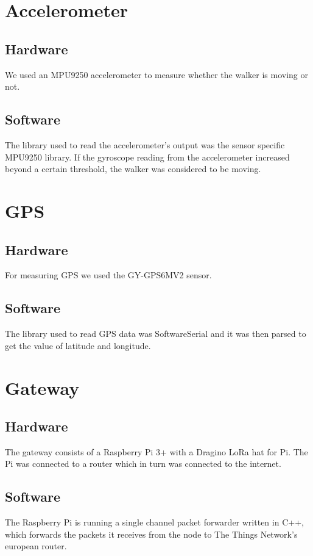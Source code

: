 \section{Accelerometer}

	\subsection{Hardware}
	We used an MPU9250 accelerometer to measure whether the walker is moving or not.

	\subsection{Software}
	The library used to read the accelerometer's output was the sensor specific MPU9250 library. If the gyroscope reading from the accelerometer increased beyond a certain threshold, the walker was considered to be moving.

\section{GPS}

	\subsection{Hardware}
	For measuring GPS we used the GY-GPS6MV2 sensor.

	\subsection{Software}
	The library used to read GPS data was SoftwareSerial and it was then parsed to get the value of latitude and longitude.

\section{Gateway}
		
	\subsection{Hardware}
	The gateway consists of a Raspberry Pi 3+ with a Dragino LoRa hat for Pi. The Pi was connected to a router which in turn was connected to the internet.


	\subsection{Software}
	The Raspberry Pi is running a single channel packet forwarder written in C++, which forwards the packets it receives from the node to The Things Network's european router. 

